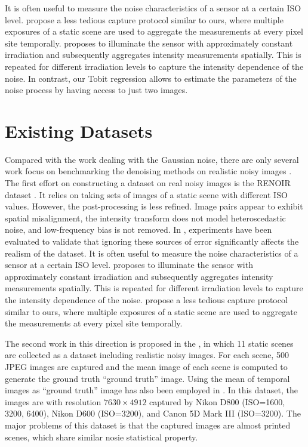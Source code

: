 It is often useful to measure the noise characteristics of a sensor at a certain ISO level. \cite{EMVA1288} propose a less tedious capture protocol similar to ours, where multiple exposures of a static scene are used to aggregate the measurements at every pixel site temporally. \cite{noisemeasurement,moldovan2006denoising} proposes to illuminate the sensor with approximately constant irradiation and subsequently aggregates intensity measurements spatially. This is repeated for different irradiation levels to capture the intensity dependence of the noise. In contrast, our Tobit regression allows to estimate the parameters of the noise process by having access to just two images.


\section{Existing Datasets}

Compared with the work dealing with the Gaussian noise, there are only several work focus on benchmarking the denoising methods on realistic noisy images \cite{RENOIR2014,crosschannel2016,dnd2017}. The first effort on constructing a dataset on real noisy images is the RENOIR dataset \cite{RENOIR2014}. It relies on taking sets of images of a static scene with different ISO values. However, the post-processing is less refined. Image pairs appear to exhibit spatial misalignment, the intensity transform does not model heteroscedastic noise, and low-frequency bias is not removed. In \cite{RENOIR2014}, experiments have been evaluated to validate that ignoring these sources of error significantly
affects the realism of the dataset. It is often useful to measure the noise characteristics of a sensor at a certain ISO level. \cite{RENOIR2014} proposes to illuminate the sensor with approximately constant irradiation and subsequently aggregates intensity measurements spatially. This is repeated for different irradiation levels to capture the intensity dependence of the noise. \cite{RENOIR2014} propose a less tedious capture protocol similar to ours, where multiple exposures of a static scene are used to aggregate the measurements at every pixel site temporally.

The second work in this direction is proposed in the \cite{crosschannel2016}, in which 11 static scenes are collected as a dataset including realistic noisy images. For each scene, 500 JPEG images are captured and the mean image of each scene is computed to generate the ground truth ``ground truth'' image. Using the mean of temporal images as ``ground truth'' image has also been employed in \cite{Liu2008,liupractical}. In this dataset, the images are with resolution $7630\times4912$ captured by Nikon D800 (ISO=1600, 3200, 6400), Nikon D600 (ISO=3200), and Canon 5D Mark III (ISO=3200). The major problems of this dataset is that the captured images are almost printed scenes, which share similar nosie statistical property. 

